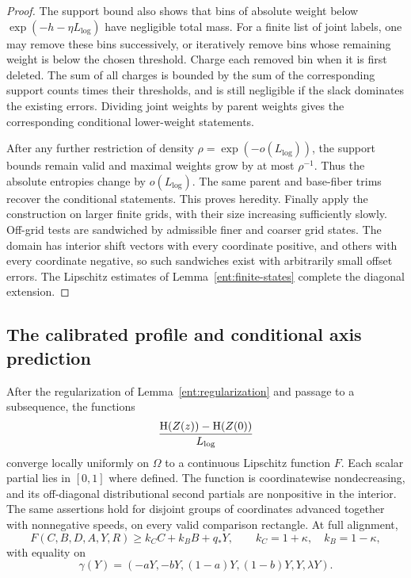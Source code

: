 \begin{proof}
The support bound also shows that bins of absolute weight below
$\exp(-h-\eta L_{\log})$ have negligible total mass.  For a finite
list of joint labels, one may remove these bins successively, or
iteratively remove bins whose remaining weight is below the chosen
threshold.  Charge each removed bin when it is first deleted.  The
sum of all charges is bounded by the sum of the corresponding
support counts times their thresholds, and is still negligible if
the slack dominates the existing errors.  Dividing joint weights by
parent weights gives the corresponding conditional lower-weight
statements.

After any further restriction of density $\rho=\exp(-o(L_{\log}))$,
the support bounds remain valid and maximal weights grow by at most
$\rho^{-1}$.  Thus the absolute entropies change by $o(L_{\log})$.
The same parent and base-fiber trims recover the conditional
statements.  This proves heredity.  Finally apply the construction on
larger finite grids, with their size increasing sufficiently slowly.
Off-grid tests are sandwiched by admissible finer and coarser grid
states.  The domain has interior shift vectors with every coordinate
positive, and others with every coordinate negative, so such
sandwiches exist with arbitrarily small offset errors.  The
Lipschitz estimates of Lemma~\ref{ent:finite-states} complete the
diagonal extension.
\end{proof}

\subsection{The calibrated profile and conditional axis prediction}

\begin{proposition}\label{ent:states}
After the regularization of Lemma~\ref{ent:regularization} and passage
to a subsequence, the functions
\[
\frac{\operatorname{H}(Z(z))-\operatorname{H}(Z(0))}{L_{\log}}
\]
converge locally uniformly on $\Omega$ to a continuous Lipschitz
function $F$.  Each scalar partial lies in $[0,1]$ where defined.
The function is coordinatewise nondecreasing, and its off-diagonal
distributional second partials are nonpositive in the interior.
The same assertions hold for disjoint groups of coordinates advanced
together with nonnegative speeds, on every valid comparison
rectangle.  At full alignment,
\begin{equation}\label{eq:source-11}
 F(C,B,D,A,Y,R)\geq k_C C+k_B B+q_*Y,
 \qquad k_C=1+\kappa,\quad k_B=1-\kappa,
\end{equation}
with equality on
\[
\gamma(Y)=(-aY,-bY,(1-a)Y,(1-b)Y,Y,\lambda Y).
\]
\end{proposition}

